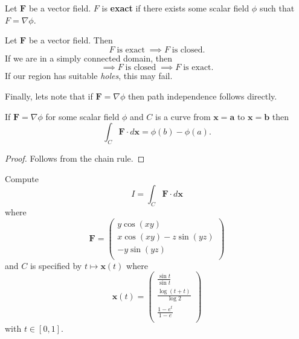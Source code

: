 \begin{definition}[Exact]
    Let $\bm F$ be a vector field.
    $F$ is \textbf{exact} if there exists some scalar field $\phi$
    such that $F = \nabla\phi$.
\end{definition}

\begin{remark}
    Let $\bm F$ be a vector field.
    Then
    \[
        F \;\text{is exact}\; \implies F \;\text{is closed}.
    \]
    If we are in a simply connected domain, then
    \[
        \implies F \;\text{is closed}\; \implies F \;\text{is exact}.
    \]
    If our region has suitable \emph{holes}, this may fail.
\end{remark}

Finally, lets note that if $\bm F = \nabla\phi$
then path independence follows directly.

\begin{theorem}[]
    If $\bm F = \nabla\phi$ for some scalar field $\phi$
    and $C$ is a curve from $\bm x = \bm a$ to $\bm x = \bm b$
    then
    \[
        \int_C \bm F \cdot d\bm x = \phi(b) - \phi(a).
    \]
\end{theorem}

\begin{proof}
    Follows from the chain rule.
\end{proof}

\begin{example}
    Compute
    \[
        I = \int_C \bm F \cdot d\bm x
    \]
    where
    \[
        \bm F =
        \begin{pmatrix}
            y\cos(xy)             \\
            x\cos(xy) - z\sin(yz) \\
            -y\sin(yz)            \\
        \end{pmatrix}
    \]
    and $C$ is specified by $t \mapsto \bm x(t)$ where
    \[
        \bm x(t) =
        \begin{pmatrix}
            \frac{\sin t}{\sin t} \\
            \frac{\log(t + t)}{\log 2} \\
            \frac{1 - e^t}{1 - e} \\ 
        \end{pmatrix}
    \]
    with $t \in [0,1]$.
\end{example}

